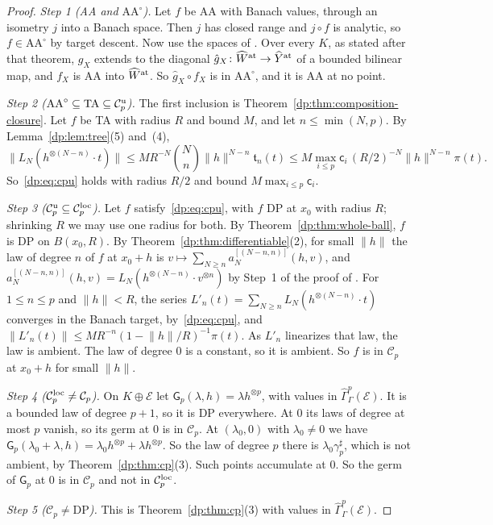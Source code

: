 \documentclass[11pt]{amsart}
\theoremstyle{definition}
\theoremstyle{remark}
\numberwithin{equation}{section}
\newcommand{\norm}[1]{\lVert #1\rVert}
\newcommand{\cC}{\mathcal{C}}
\theoremstyle{plain}
\theoremstyle{definition}
\theoremstyle{plain}
\newcommand{\hGamma}{\widehat\Gamma}
\begin{document}
\begin{proof}
\emph{Step 1 (AA and $\mathrm{AA}^\circ$).} Let $f$ be AA with Banach values, through an isometry $j$ into a Banach space. Then $j$ has closed range and $j\circ f$ is analytic, so $f\in\mathrm{AA}^\circ$ by target descent. Now use the spaces of \cite[Theorem~14.17]{I}. Over every $K$, as stated after that theorem, $g_X$ extends to the diagonal $\hat g_X\colon\widehat W^{\rm at}\to\widehat Y^{\rm at}$ of a bounded bilinear map, and $f_X$ is AA into $\widehat W^{\rm at}$. So $\hat g_X\circ f_X$ is in $\mathrm{AA}^\circ$, and it is AA at no point.

\emph{Step 2 ($\mathrm{AA}^\circ\subseteq\mathrm{TA}\subseteq\cC_p^{\rm u}$).} The first inclusion is Theorem~\ref{dp:thm:composition-closure}. Let $f$ be TA with radius $R$ and bound $M$, and let $n\le\min(N,p)$. By Lemma~\ref{dp:lem:tree}(5) and~(4),
\[
 \norm{L_N(h^{\otimes(N-n)}\cdot t)}\le MR^{-N}\binom Nn\norm h^{N-n}\mathfrak t_n(t)\le M\max_{i\le p}\mathsf c_i\,(R/2)^{-N}\norm h^{N-n}\pi(t).
\]
So~\eqref{dp:eq:cpu} holds with radius $R/2$ and bound $M\max_{i\le p}\mathsf c_i$.

\emph{Step 3 ($\cC_p^{\rm u}\subseteq\cC_p^{\rm loc}$).} Let $f$ satisfy~\eqref{dp:eq:cpu}, with $f$ DP at $x_0$ with radius $R$; shrinking $R$ we may use one radius for both. By Theorem~\ref{dp:thm:whole-ball}, $f$ is DP on $B(x_0,R)$. By Theorem~\ref{dp:thm:differentiable}(2), for small $\norm h$ the law of degree $n$ of $f$ at $x_0+h$ is $v\mapsto\sum_{N\ge n}a_N^{[(N-n,n)]}(h,v)$, and $a_N^{[(N-n,n)]}(h,v)=L_N(h^{\otimes(N-n)}\cdot v^{\otimes n})$ by Step~1 of the proof of \cite[Lemma~Q.4]{I}. For $1\le n\le p$ and $\norm h<R$, the series $L'_n(t)=\sum_{N\ge n}L_N(h^{\otimes(N-n)}\cdot t)$ converges in the Banach target, by~\eqref{dp:eq:cpu}, and $\norm{L'_n(t)}\le MR^{-n}(1-\norm h/R)^{-1}\pi(t)$. As $L'_n$ linearizes that law, the law is ambient. The law of degree $0$ is a constant, so it is ambient. So $f$ is in $\cC_p$ at $x_0+h$ for small $\norm h$.

\emph{Step 4 ($\cC_p^{\rm loc}\ne\cC_p$).} On $K\oplus\mathcal E$ let $\mathsf G_p(\lambda,h)=\lambda h^{\otimes p}$, with values in $\hGamma^p_\Gamma(\mathcal E)$. It is a bounded law of degree $p+1$, so it is DP everywhere. At $0$ its laws of degree at most $p$ vanish, so its germ at $0$ is in $\cC_p$. At $(\lambda_0,0)$ with $\lambda_0\ne0$ we have $\mathsf G_p(\lambda_0+\lambda,h)=\lambda_0h^{\otimes p}+\lambda h^{\otimes p}$. So the law of degree $p$ there is $\lambda_0\gamma^\sharp_p$, which is not ambient, by Theorem~\ref{dp:thm:cp}(3). Such points accumulate at $0$. So the germ of $\mathsf G_p$ at $0$ is in $\cC_p$ and not in $\cC_p^{\rm loc}$.

\emph{Step 5 ($\cC_p\ne\mathrm{DP}$).} This is Theorem~\ref{dp:thm:cp}(3) with values in $\hGamma^p_\Gamma(\mathcal E)$.
\end{proof}
\end{document}
